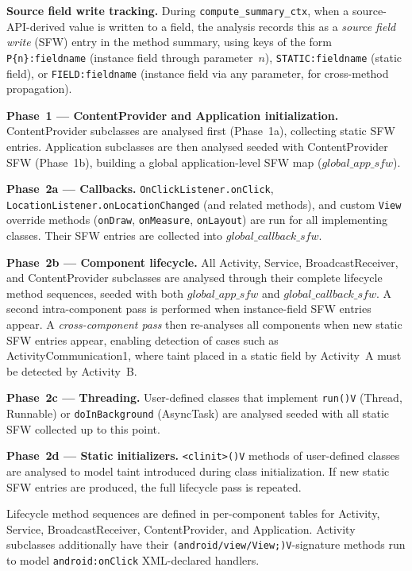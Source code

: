 \documentclass[conference]{IEEEtran}
\begin{document}
\textbf{Source field write tracking.} During \texttt{compute\_summary\_ctx},
when a source-API-derived value is written to a field, the analysis records this
as a \emph{source field write} (SFW) entry in the method summary, using keys of
the form \texttt{P\{n\}:fieldname} (instance field through parameter~$n$),
\texttt{STATIC:fieldname} (static field), or \texttt{FIELD:fieldname} (instance
field via any parameter, for cross-method propagation).

\textbf{Phase~1 --- ContentProvider and Application initialization.}
ContentProvider subclasses are analysed first (Phase~1a), collecting static SFW
entries. Application subclasses are then analysed seeded with ContentProvider SFW
(Phase~1b), building a global application-level SFW map ($\mathit{global\_app\_sfw}$).

\textbf{Phase~2a --- Callbacks.} \texttt{OnClickListener.onClick},
\texttt{LocationListener.onLocationChanged} (and related methods), and custom
\texttt{View} override methods (\texttt{onDraw}, \texttt{onMeasure},
\texttt{onLayout}) are run for all implementing classes. Their SFW entries are
collected into $\mathit{global\_callback\_sfw}$.

\textbf{Phase~2b --- Component lifecycle.} All Activity, Service,
BroadcastReceiver, and ContentProvider subclasses are analysed through their
complete lifecycle method sequences, seeded with both $\mathit{global\_app\_sfw}$
and $\mathit{global\_callback\_sfw}$. A second intra-component pass is performed
when instance-field SFW entries appear. A \emph{cross-component pass} then
re-analyses all components when new static SFW entries appear, enabling detection
of cases such as ActivityCommunication1, where taint placed in a static field by
Activity~A must be detected by Activity~B.

\textbf{Phase~2c --- Threading.} User-defined classes that implement
\texttt{run()V} (Thread, Runnable) or \texttt{doInBackground} (AsyncTask) are
analysed seeded with all static SFW collected up to this point.

\textbf{Phase~2d --- Static initializers.} \texttt{<clinit>()V} methods of
user-defined classes are analysed to model taint introduced during class
initialization. If new static SFW entries are produced, the full lifecycle pass
is repeated.

Lifecycle method sequences are defined in per-component tables for Activity,
Service, BroadcastReceiver, ContentProvider, and Application. Activity subclasses
additionally have their \texttt{(android/view/View;)V}-signature methods run to
model \texttt{android:onClick} XML-declared handlers.
\end{document}
